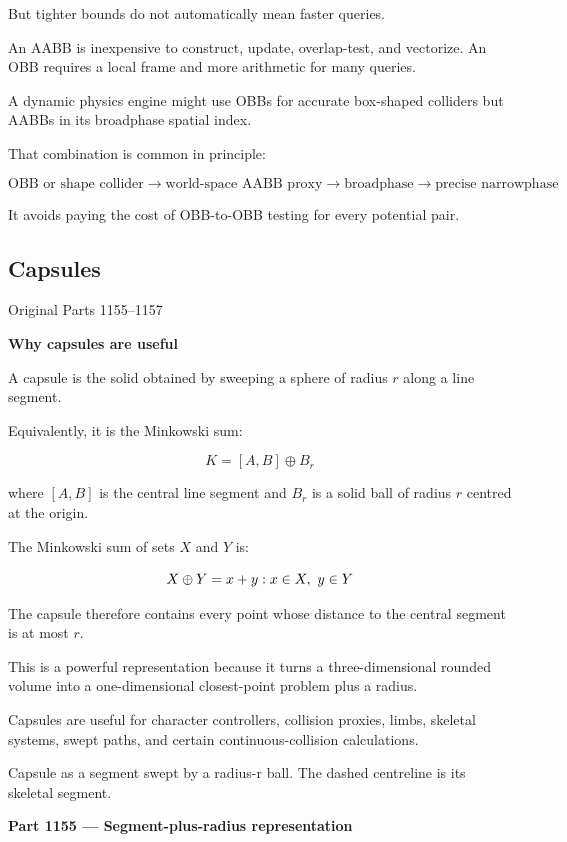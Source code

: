But tighter bounds do not automatically mean faster queries.

An AABB is inexpensive to construct, update, overlap-test, and vectorize. An OBB requires a local frame and more arithmetic for many queries.

A dynamic physics engine might use OBBs for accurate box-shaped colliders but AABBs in its broadphase spatial index.

That combination is common in principle:

\[
\text{OBB or shape collider} \rightarrow \text{world-space AABB proxy} \rightarrow \text{broadphase} \rightarrow \text{precise narrowphase}
\]

It avoids paying the cost of OBB-to-OBB testing for every potential pair.

\subsection{Capsules}\label{03-visual-computing-i-ch021-capsules}

Original Parts 1155--1157

\textbf{Why capsules are useful}

A capsule is the solid obtained by sweeping a sphere of radius \(r\) along a line segment.

Equivalently, it is the Minkowski sum:

\[
\boxed{ K=[A,B]\oplus B_r }
\]

where \([A,B]\) is the central line segment and \(B_r\) is a solid ball of radius \(r\) centred at the origin.

The Minkowski sum of sets \(X\) and \(Y\) is:

\[
X\oplus Y=\\{x+y:x\in X,\ y\in Y\\}
\]

The capsule therefore contains every point whose distance to the central segment is at most \(r\).

This is a powerful representation because it turns a three-dimensional rounded volume into a one-dimensional closest-point problem plus a radius.

Capsules are useful for character controllers, collision proxies, limbs, skeletal systems, swept paths, and certain continuous-collision calculations.

Capsule as a segment swept by a radius-r ball. The dashed centreline is its skeletal segment.

\textbf{Part 1155 --- Segment-plus-radius representation}

